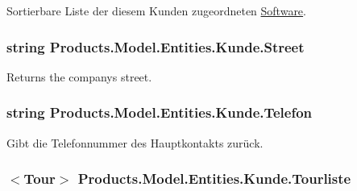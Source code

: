 Sortierbare Liste der diesem Kunden zugeordneten \hyperlink{class_products_1_1_model_1_1_entities_1_1_software}{Software}. 

\subsubsection[{\texorpdfstring{Street}{Street}}]{\setlength{\rightskip}{0pt plus 5cm}string Products.\+Model.\+Entities.\+Kunde.\+Street\hspace{0.3cm}{\ttfamily [get]}}\hypertarget{class_products_1_1_model_1_1_entities_1_1_kunde_ac8d44806c21f1470c0631b0702143a16}{}\label{class_products_1_1_model_1_1_entities_1_1_kunde_ac8d44806c21f1470c0631b0702143a16}


Returns the company\textquotesingle{}s street. 

\subsubsection[{\texorpdfstring{Telefon}{Telefon}}]{\setlength{\rightskip}{0pt plus 5cm}string Products.\+Model.\+Entities.\+Kunde.\+Telefon\hspace{0.3cm}{\ttfamily [get]}}\hypertarget{class_products_1_1_model_1_1_entities_1_1_kunde_ac5fb33edecc600bbbcf1a4f15466079c}{}\label{class_products_1_1_model_1_1_entities_1_1_kunde_ac5fb33edecc600bbbcf1a4f15466079c}


Gibt die Telefonnummer des Hauptkontakts zurück. 

\subsubsection[{\texorpdfstring{Tourliste}{Tourliste}}]{$<${\bf Tour}$>$ Products.\+Model.\+Entities.\+Kunde.\+Tourliste\hspace{0.3cm}{\ttfamily [get]}}\hypertarget{class_products_1_1_model_1_1_entities_1_1_kunde_ab0a7b3ca00ed6c76dd5dda5c3178926f}{}\label{class_products_1_1_model_1_1_entities_1_1_kunde_ab0a7b3ca00ed6c76dd5dda5c3178926f}


